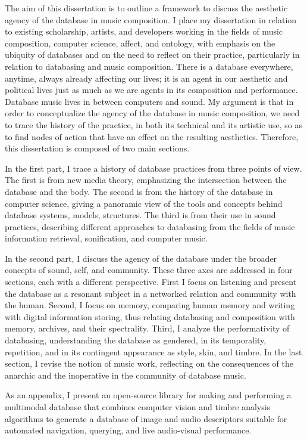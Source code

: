 The aim of this dissertation is to outline a framework to discuss the aesthetic agency of the database in music composition. I place my dissertation in relation to existing scholarship, artists, and developers working in the fields of music composition, computer science, affect, and ontology, with emphasis on the ubiquity of databases and on the need to reflect on their practice, particularly in relation to databasing and music composition. There is a database everywhere, anytime, always already affecting our lives; it is an agent in our aesthetic and political lives just as much as we are agents in its composition and performance. Database music lives in between computers and sound. My argument is that in order to conceptualize the agency of the database in music composition, we need to trace the history of the practice, in both its technical and its artistic use, so as to find nodes of action that have an effect on the resulting aesthetics. Therefore, this dissertation is composed of two main sections.

In the first part, I trace a history of database practices from three points of view. The first is from new media theory, emphasizing the intersection between the database and the body. The second is from the history of the database in computer science, giving a panoramic view of the tools and concepts behind database systems, models, structures. The third is from their use in sound practices, describing different approaches to databasing from the fields of music information retrieval, sonification, and computer music. 

In the second part, I discuss the agency of the database under the broader concepts of sound, self, and community. These three axes are addressed in four sections, each with a different perspective. First I focus on listening and present the database as a resonant subject in a networked relation and community with the human. Second, I focus on memory, comparing human memory and writing with digital information storing, thus relating databasing and composition with memory, archives, and their spectrality. Third, I analyze the performativity of databasing, understanding the database as gendered, in its temporality, repetition, and in its contingent appearance as style, skin, and timbre. In the last section, I revise the notion of music work, reflecting on the consequences of the anarchic and the inoperative in the community of database music.

As an appendix, I present an open-source library for making and performing a multimodal database that combines computer vision and timbre analysis algorithms to generate a database of image and audio descriptors suitable for automated navigation, querying, and live audio-visual performance.
